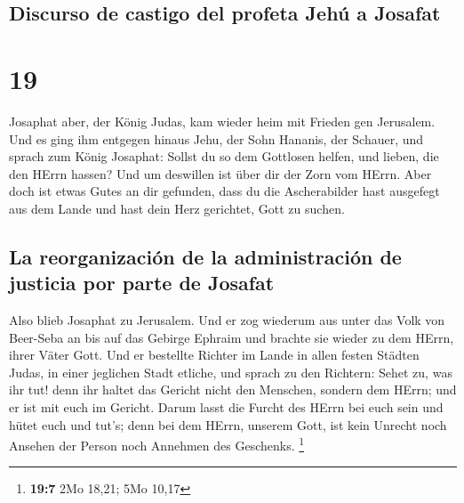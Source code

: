\hypertarget{discurso-de-castigo-del-profeta-jehuxfa-a-josafat}{%
\subsection{Discurso de castigo del profeta Jehú a
Josafat}\label{discurso-de-castigo-del-profeta-jehuxfa-a-josafat}}

\hypertarget{section-18}{%
\section{19}\label{section-18}}

 Josaphat aber, der König Judas, kam wieder heim mit
Frieden gen Jerusalem.  Und es ging ihm entgegen hinaus
Jehu, der Sohn Hananis, der Schauer, und sprach zum König Josaphat:
Sollst du so dem Gottlosen helfen, und lieben, die den HErrn hassen? Und
um deswillen ist über dir der Zorn vom HErrn.  Aber doch
ist etwas Gutes an dir gefunden, dass du die Ascherabilder hast
ausgefegt aus dem Lande und hast dein Herz gerichtet, Gott zu suchen.

\hypertarget{la-reorganizaciuxf3n-de-la-administraciuxf3n-de-justicia-por-parte-de-josafat}{%
\subsection{La reorganización de la administración de justicia por parte
de
Josafat}\label{la-reorganizaciuxf3n-de-la-administraciuxf3n-de-justicia-por-parte-de-josafat}}

 Also blieb Josaphat zu Jerusalem. Und er zog wiederum aus
unter das Volk von Beer-Seba an bis auf das Gebirge Ephraim und brachte
sie wieder zu dem HErrn, ihrer Väter Gott.  Und er
bestellte Richter im Lande in allen festen Städten Judas, in einer
jeglichen Stadt etliche,  und sprach zu den Richtern:
Sehet zu, was ihr tut! denn ihr haltet das Gericht nicht den Menschen,
sondern dem HErrn; und er ist mit euch im Gericht.  Darum
lasst die Furcht des HErrn bei euch sein und hütet euch und tut's; denn
bei dem HErrn, unserem Gott, ist kein Unrecht noch Ansehen der Person
noch Annehmen des Geschenks. \footnote{\textbf{19:7} 2Mo 18,21; 5Mo
  10,17}

